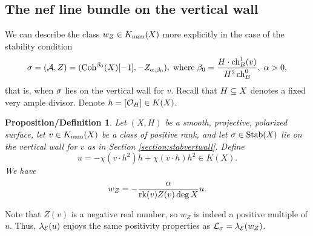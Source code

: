 \documentclass[letterpaper,12pt]{amsart}
\newtheorem{propdef}[thm]{Proposition/Definition}
\theoremstyle{remark}
\begin{document}
\subsection{The nef line bundle on the vertical wall}
We can describe the class $w_Z \in K_{\mathrm{num}}(X)$ more explicitly in the case of the stability condition 
\[ \sigma = (\mathcal{A}, Z) = (\mathrm{Coh}^{\beta_0}(X)[-1], -Z_{\alpha, \beta_0}), \; \mathrm{where} \; \beta_0 = \frac{H \cdot \operatorname{\mathrm{ch}}_B^1(v)}{H^2 \operatorname{\mathrm{ch}}_B^0}, \; \alpha > 0, \] that is, when $\sigma$ lies on the vertical wall for $v$. Recall that $H \subseteq X$ denotes a fixed very ample divisor. Denote $h = [\mathcal{O}_H] \in K(X)$.
\begin{propdef}\label{nefclassonverticalwall}
    Let $(X,H)$ be a smooth, projective, polarized surface, let $v \in K_{\mathrm{num}}(X)$ be a class of positive rank, and let $\sigma \in \operatorname{\mathrm{Stab}}(X)$ lie on the vertical wall for $v$ as in Section \ref{section:stabvertwall}. Define 
    \[ u = -\chi(v \cdot h^2) h + \chi(v \cdot h) h^2 \in K(X). \]
    We have 
    \[ w_Z = -\frac{\alpha}{\operatorname{\mathrm{rk}}(v) Z(v) \deg X} u. \]
\end{propdef}
Note that $Z(v)$ is a negative real number, so $w_Z$ is indeed a positive multiple of $u$. Thus, $\lambda_{\mathcal{E}}(u)$ enjoys the same positivity properties as $\mathcal{L}_\sigma = \lambda_{\mathcal{E}}(w_Z)$.
\end{document}
